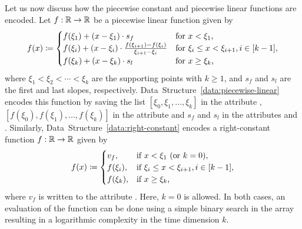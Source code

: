 Let us now discuss how the piecewise constant and piecewise linear functions are encoded.
Let $f: \mathbb{R} \rightarrow \mathbb{R}$ be a piecewise linear function given by \[
    f(x) \coloneqq \begin{cases}
        f(\xi_1) +  (x - \xi_1) \cdot s_f & \text{for $x < \xi_1$,} \\
        f(\xi_i) + (x - \xi_i) \cdot \frac{f(\xi_{i+1}) - f(\xi_i)}{\xi_{i+1} - \xi_i} & \text{for $\xi_i \leq x < \xi_{i+1}, i \in [k-1]$},\\
        f(\xi_k) + (x - \xi_k)\cdot s_l & \text{for $x \geq \xi_k$,}
    \end{cases}
\]
where $\xi_1 < \xi_2 < \cdots < \xi_k$ are the supporting points with $k\geq 1$, and $s_f$ and $s_l$ are the first and last slopes, respectively.
Data~Structure~\ref{data:piecewise-linear} encodes this function by saving the list $[\xi_0,\xi_1,\dots,\xi_k]$ in the attribute , $[f(\xi_0), f(\xi_1),\dots, f(\xi_k)]$ in the attribute  and $s_f$ and $s_l$ in the attributes  and .
Similarly, Data~Structure~\ref{data:right-constant} encodes a right-constant function $f:\mathbb{R} \rightarrow \mathbb{R}$ given by \[
    f(x) \coloneqq \begin{cases}
        v_f, & \text{if $x < \xi_1$ (or $k=0$),} \\
        f(\xi_i), & \text{if $\xi_i \leq x < \xi_{i+1}, i \in [k-1]$},\\
        f(\xi_k), & \text{if $x \geq \xi_k$,}
    \end{cases}
\]
where $v_f$ is written to the attribute .
Here, $k=0$ is allowed.
In both cases, an evaluation of the function can be done using a simple binary search in the  array resulting in a logarithmic complexity in the time dimension $k$.

